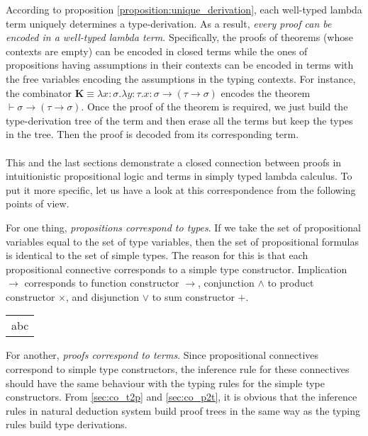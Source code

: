 According to proposition \ref{proposition:unique_derivation}, each well-typed lambda term uniquely determines a type-derivation. As a result, \emph{every proof can be encoded in a well-typed lambda term}. Specifically, the proofs of theorems (whose contexts are empty) can be encoded in closed terms while the ones of propositions having assumptions in their contexts can be encoded in terms with the free variables encoding the assumptions in the typing contexts. For instance, the combinator $ \textbf{K} \equiv \lambda x:\sigma . \lambda y:\tau . x: \sigma \to (\tau \to \sigma) $ encodes the theorem $ \vdash \sigma \to (\tau \to \sigma) $. Once the proof of the theorem is required, we just build the type-derivation tree of the term and then erase all the terms but keep the types in the tree. Then the proof is decoded from its corresponding term.
\\
\\
This and the last sections demonstrate a closed connection between proofs in intuitionistic propositional logic and terms in simply typed lambda calculus. To put it more specific, let us have a look at this correspondence from the following points of view.

For one thing, \emph{propositions correspond to types}. If we take the set of propositional variables equal to the set of type variables, then the set of propositional formulas is identical to the set of simple types. The reason for this is that each propositional connective corresponds to a simple type constructor. Implication $ \to $ corresponds to function constructor $ \to $, conjunction $ \land $ to product constructor $ \times $, and disjunction $ \lor $ to sum constructor $ + $.
\begin{center}
\begin{tabular}{c}
abc
\end{tabular}
\end{center}


For another, \emph{proofs correspond to terms}. Since propositional connectives correspond to simple type constructors, the inference rule for these connectives should have the same behaviour with the typing rules for the simple type constructors. From \ref{sec:co_t2p} and \ref{sec:co_p2t}, it is obvious that the inference rules in natural deduction system build proof trees in the same way as the typing rules build type derivations.